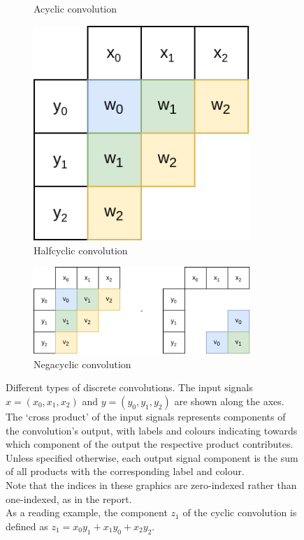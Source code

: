 \begin{figure}
\begin{subfigure}{.33\textwidth}
				\caption{Acyclic convolution}
				\label{fig:acyclic_convolution}
		\end{subfigure}%
		\begin{subfigure}{.33\textwidth}
				\centering
				\includegraphics[width=0.9\textwidth]{../resources/halfcyclic_convolution.drawio.png}
				\caption{Halfcyclic convolution}
				\label{fig:halfcyclic_convolution}
		\end{subfigure}
		\begin{subfigure}{.66\textwidth}
				\centering
				\includegraphics[width=0.9\textwidth]{../resources/negacyclic_convolution.drawio.png}
				\caption{Negacyclic convolution}
				\label{fig:negacyclic_convolution}
		\end{subfigure}
		\caption{
				Different types of discrete convolutions. The input signals $x
				= (x_0, x_1, x_2)$ and $y = (y_0, y_1, y_2)$ are shown along
				the axes. The `cross product' of the input signals represents
				components of the convolution's output, with  labels and
				colours indicating towards which component of the output the
				respective product contributes.  Unless specified otherwise,
				each output signal component is the sum of all products with
				the corresponding label and colour.\\
				Note that the indices in these graphics are zero-indexed rather
				than one-indexed, as in the report.\\
				As a reading example, the component $z_1$ of the cyclic
				convolution is defined as $z_1 = x_0 y_1 + x_1 y_0 + x_2 y_2$.
}
\end{figure}

